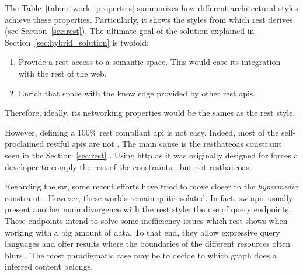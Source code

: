 
The Table~\ref{tab:network_properties} summarizes how different architectural styles achieve these properties.
Particularly, it shows the styles from which \ac{rest} derives (see Section~\ref{sec:rest}).
The ultimate goal of the solution explained in Section~\ref{sec:hybrid_solution} is twofold:
\begin{enumerate}
  \item Provide a \ac{rest} access to a semantic space.
       This would ease its integration with the rest of the web.
  \item Enrich that space with the knowledge provided by other \ac{rest} \acp{api}.
\end{enumerate}
Therefore, ideally, its networking properties would be the sames as the \ac{rest} style.




However, defining a 100\% \ac{rest} compliant \ac{api} is not easy.
Indeed, most of the self-proclaimed \ac{rest}ful \acp{api} are not \citep{house_how_2012}. %
The main cause is the \ac{resthateoas} constraint seen in the Section~\ref{sec:rest} \citep{fielding_rest_2008}.
Using \ac{http} as it was originally designed for forces a developer to comply the rest of the constraints \citet{moore_hypermedia_2010}, but not \ac{resthateoas}.


Regarding the \ac{sw}, some recent efforts have tried to move closer to the \emph{hypermedia} constraint \citep{steiner_fulfilling_2011,kjernsmo_necessity_2012}.
However, these worlds remain quite isolated.
In fact, \ac{sw} \acp{api} usually present another main divergence with the \ac{rest} style: the use of query endpoints.
These endpoints intend to solve some inefficiency issues which \ac{rest} shows when working with a big amount of data. %
To that end, they allow expressive query languages and offer results where the boundaries of the different resources often blurs \citep{wilde_restful_2009}.
The most paradigmatic case may be to decide to which graph does a inferred content belongs. %


